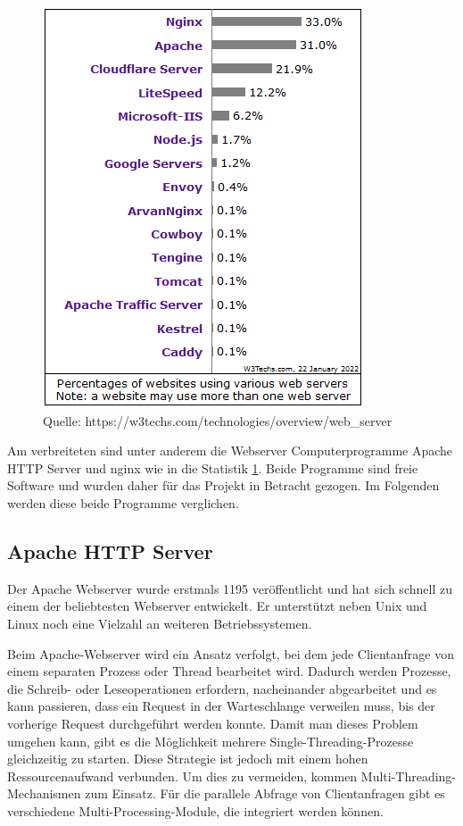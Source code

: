 \begin{figure}[htbp]
	\centering
	\includegraphics{images/StatistikWebserver.png}
	\caption{Quelle: https://w3techs.com/technologies/overview/web\_server}
	\label{fig:WebserverStatistik}
\end{figure}


Am verbreiteten sind unter anderem die Webserver Computerprogramme Apache HTTP Server und nginx wie in die Statistik \ref{fig:WebserverStatistik}. Beide Programme sind freie Software und wurden daher für das Projekt in Betracht gezogen. Im Folgenden werden diese beide Programme verglichen.


\subsection{Apache HTTP Server}

Der Apache Webserver wurde erstmals 1195 veröffentlicht und hat sich schnell zu einem der beliebtesten Webserver entwickelt. Er unterstützt neben Unix und Linux noch eine Vielzahl an weiteren Betriebssystemen.

Beim Apache-Webserver wird ein Ansatz verfolgt, bei dem jede Clientanfrage von einem separaten Prozess oder Thread bearbeitet wird. Dadurch werden Prozesse, die Schreib- oder Leseoperationen erfordern, nacheinander abgearbeitet und es kann passieren, dass ein Request in der Warteschlange verweilen muss, bis der vorherige Request durchgeführt werden konnte. Damit man dieses Problem umgehen kann, gibt es die Möglichkeit mehrere Single-Threading-Prozesse gleichzeitig zu starten. Diese Strategie ist jedoch mit einem hohen Ressourcenaufwand verbunden. Um dies zu vermeiden, kommen Multi-Threading-Mechanismen zum Einsatz. Für die parallele Abfrage von Clientanfragen gibt es verschiedene Multi-Processing-Module, die integriert werden können.

